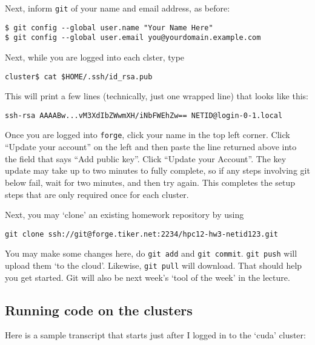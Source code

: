 \documentclass[11pt]{article}
\begin{document}
Next, inform \texttt{git} of your name and email address, as before:
\begin{lstlisting}
$ git config --global user.name "Your Name Here"
$ git config --global user.email you@yourdomain.example.com
\end{lstlisting}

Next, while you are logged into each clster, type
\begin{lstlisting}
cluster$ cat $HOME/.ssh/id_rsa.pub
\end{lstlisting}
This will print a few lines (technically, just one wrapped line) that
looks like this:
\begin{lstlisting}
ssh-rsa AAAABw...vM3XdIbZWwmXH/iNbFWEhZw== NETID@login-0-1.local
\end{lstlisting}
Once you are logged into \texttt{forge}, click your name in the top
left corner. Click ``Update your account'' on the left and then paste
the line returned above into the field that says ``Add public key''.
Click ``Update your Account''. The key update may take up to two
minutes to fully complete, so if any steps involving git below fail,
wait for two minutes, and then try again.
This completes the setup steps that are only required once for each
cluster.

Next, you may `clone' an existing homework repository by using
\begin{lstlisting}
git clone ssh://git@forge.tiker.net:2234/hpc12-hw3-netid123.git
\end{lstlisting}
You may make some changes here, do \verb|git add| and \verb|git commit|.
\verb|git push| will upload them `to the cloud'. Likewise,
\verb|git pull| will download. That should help you get started. Git
will also be next week's `tool of the week' in the lecture.

\subsection*{Running code on the clusters}
Here is a sample transcript that starts just after I logged in to the `cuda'
cluster:
\end{document}
